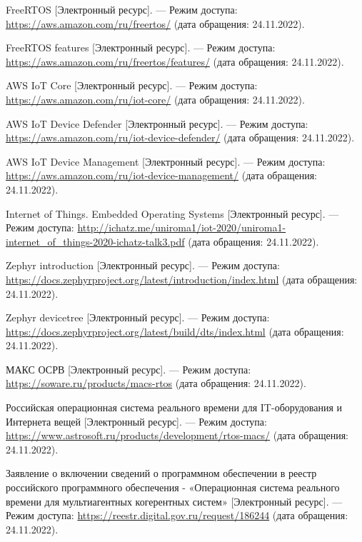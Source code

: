 \begin{thebibliography}{}
	FreeRTOS [Электронный ресурс]. — Режим доступа: \url{https://aws.amazon.com/ru/freertos/} (дата обращения: 24.11.2022).
	
	FreeRTOS features [Электронный ресурс]. — Режим доступа: \url{https://aws.amazon.com/ru/freertos/features/} (дата обращения: 24.11.2022).
	
	AWS IoT Core [Электронный ресурс]. — Режим доступа: \url{https://aws.amazon.com/ru/iot-core/} (дата обращения: 24.11.2022).
	
	AWS IoT Device Defender [Электронный ресурс]. — Режим доступа: \url{https://aws.amazon.com/ru/iot-device-defender/} (дата обращения: 24.11.2022).
	
	AWS IoT Device Management [Электронный ресурс]. — Режим
	доступа: \url{https://aws.amazon.com/ru/iot-device-management/} (дата
	обращения: 24.11.2022).
	
	Internet of Things. Embedded Operating Systems [Электронный ресурс]. — Режим доступа: \url{http://ichatz.me/uniroma1/iot-2020/uniroma1-internet_of_things-2020-ichatz-talk3.pdf} (дата обращения:
	24.11.2022).
	
	Zephyr introduction [Электронный ресурс]. — Режим доступа:
	\url{https://docs.zephyrproject.org/latest/introduction/index.html} (дата обращения: 24.11.2022).
	
	Zephyr devicetree [Электронный ресурс]. — Режим доступа:
	\url{https://docs.zephyrproject.org/latest/build/dts/index.html} (дата обращения: 24.11.2022).
	
	МАКС ОСРВ [Электронный ресурс]. — Режим доступа: \url{https://soware.ru/products/macs-rtos} (дата обращения: 24.11.2022).
	
	Российская операционная система реального времени для IT-оборудования и Интернета вещей [Электронный ресурс]. — Режим
	доступа: \url{https://www.astrosoft.ru/products/development/rtos-macs/}
	(дата обращения: 24.11.2022).
	
	Заявление о включении сведений о программном обеспечении
	в реестр российского программного обеспечения - «Операционная система реального времени для мультиагентных когерентных систем»
	[Электронный ресурс]. — Режим доступа: \url{https://reestr.digital.gov.ru/request/186244} (дата обращения: 24.11.2022).
	

\end{thebibliography}
